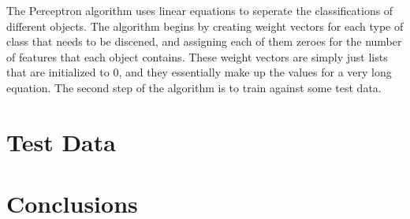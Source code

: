 \documentclass{article}
\begin{document}
The Perceptron algorithm uses linear equations to seperate the classifications of different objects. The algorithm begins by creating weight vectors for each type of class that needs to be discened, and assigning each of them zeroes for the number of features that each object contains. These weight vectors are simply just lists that are initialized to 0, and they essentially make up the values for a very long equation. The second step of the algorithm is to train against some test data.

\section{Test Data}

\section{Conclusions}
\end{document}
